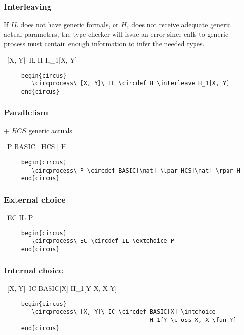 \documentclass{article}
\begin{document}
\subsubsection{Interleaving}

If $IL$ does not have generic formals, or $H_1$ does not receive adequate generic actual parameters,
the type checker will issue an error since calls to generic process must contain enough information
to infer the needed types.
%
\begin{circus}
    \circprocess\ [X, Y]\ IL \circdef H \interleave H_1[X, Y]
\end{circus}
%
\begin{verbatim}
     begin{circus}
        \circprocess\ [X, Y]\ IL \circdef H \interleave H_1[X, Y]
     end{circus}
\end{verbatim}

\subsubsection{Parallelism}

+ $HCS$ generic actuals
\begin{circus}
    \circprocess\ P \circdef BASIC[\nat] \lpar HCS[\nat] \rpar H
\end{circus}
%
\begin{verbatim}
     begin{circus}
        \circprocess\ P \circdef BASIC[\nat] \lpar HCS[\nat] \rpar H
     end{circus}
\end{verbatim}

\subsubsection{External choice}

\begin{circus}
    \circprocess\ EC \circdef IL \extchoice P
\end{circus}
%
\begin{verbatim}
     begin{circus}
        \circprocess\ EC \circdef IL \extchoice P
     end{circus}
\end{verbatim}


\subsubsection{Internal choice}

\begin{circus}
    \circprocess\ [X, Y]\ IC \circdef BASIC[X] \intchoice H_1[Y \cross X, X \fun Y]
\end{circus}
%
\begin{verbatim}
     begin{circus}
        \circprocess\ [X, Y]\ IC \circdef BASIC[X] \intchoice
                                          H_1[Y \cross X, X \fun Y]
     end{circus}
\end{verbatim}
\end{document}
